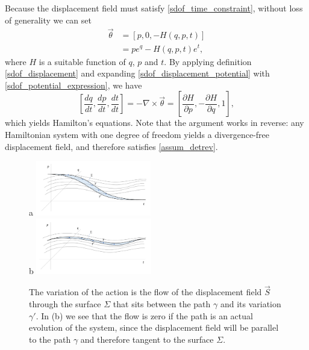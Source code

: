 \documentclass[10pt,twocolumn, nofootinbib]{revtex4-2}
\begin{document}
Because the displacement field must satisfy \ref{sdof_time_constraint}, without loss of generality we can set
\begin{equation}\label{sdof_potential_expression}
\begin{aligned}
	\vec{\theta} &= [p, 0, -H(q,p,t)] \\
	&= p e^q - H(q,p,t) e^t,
\end{aligned}
\end{equation}
where $H$ is a suitable function of $q$, $p$ and $t$. By applying definition \ref{sdof_displacement} and expanding \ref{sdof_displacement_potential} with \ref{sdof_potential_expression}, we have
\begin{equation}\label{sdof_Ham_eq}
	\left[ \frac{dq}{dt},\frac{dp}{dt},\frac{dt}{dt} \right] = - \nabla \times \vec{\theta} = \left[ \frac{\partial H}{\partial p},-\frac{\partial H}{\partial q}, 1 \right],
\end{equation}
which yields Hamilton's equations. Note that the argument works in reverse: any Hamiltonian system with one degree of freedom yields a divergence-free displacement field, and therefore satisfies \ref{assum_detrev}.

\begin{figure}
	a \includegraphics[width = 0.45\textwidth]{ActionNonOptimized.png} \\
	b \includegraphics[width = 0.45\textwidth]{ActionOptimized.png}
	\caption{\footnotesize{The variation of the action is the flow of the displacement field $\vec{S}$ through the surface $\Sigma$ that sits between the path $\gamma$ and its variation $\gamma'$. In (b) we see that the flow is zero if the path is an actual evolution of the system, since the displacement field will be parallel to the path $\gamma$ and therefore tangent to the surface $\Sigma$.}}\label{fig_action}
\end{figure}
\end{document}
